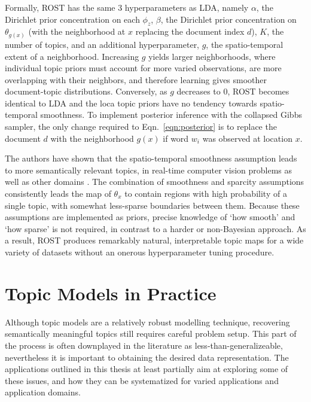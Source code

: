 Formally, ROST has the same 3 hyperparameters as LDA, namely $\alpha$, the Dirichlet prior concentration on each $\phi_z$, $\beta$, the Dirichlet prior concentration on $\theta_{g(x)}$ (with the neighborhood at $x$ replacing the document index $d$), $K$, the number of topics, and an additional hyperparameter, $g$, the spatio-temporal extent of a neighborhood. Increasing $g$ yields larger neighborhoods, where individual topic priors must account for more varied observations, are more overlapping with their neighbors, and therefore learning gives smoother document-topic distributions. Conversely, as $g$ decreases to 0, ROST becomes identical to LDA and the loca topic priors have no tendency towards spatio-temporal smoothness. To implement posterior inference with the collapsed Gibbs sampler, the only change required to Eqn.~\ref{eqn:posterior} is to replace the document $d$ with the neighborhood $g(x)$ if word $w_i$ was observed at location $x$.

The authors have shown that the spatio-temporal smoothness assumption leads to more semantically relevant topics, in real-time computer vision problems as well as other domains \citep{Girdhar2012, Girdhar2014a, Girdhar2016}. The combination of smoothness and sparcity assumptions consistently leads the map of $\theta_x$ to contain regions with high probability of a single topic, with somewhat less-sparse boundaries between them. Because these assumptions are implemented as priors, precise knowledge of `how smooth' and `how sparse' is not required, in contrast to a harder or non-Bayesian approach. As a result, ROST produces remarkably natural, interpretable topic maps for a wide variety of datasets without an onerous hyperparameter tuning procedure.

\section{Topic Models in Practice}
Although topic models are a relatively robust modelling technique, recovering semantically meaningful topics still requires careful problem setup. This part of the process is often downplayed in the literature as less-than-generalizeable, nevertheless it is important to obtaining the desired data representation. The applications outlined in this thesis at least partially aim at exploring some of these issues, and how they can be systematized for varied applications and application domains.

